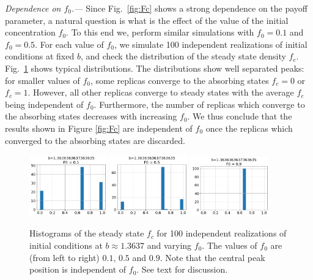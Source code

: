 \documentclass[a4paper]{jpconf}
\begin{document}
\emph{Dependence on $f_0$.---} Since Fig.\ \ref{fig:Fc} shows a strong dependence on the payoff parameter, a natural question is what is the effect of the value of the initial concentration $f_0$. To this end we, perform similar simulations with
$f_0 = 0.1$ and $f_0 = 0.5$. For each value of $f_0$, we simulate 100 independent realizations of initial conditions at fixed $b$, and check the distribution of the steady state density $f_c$. Fig.\ \ref{fig:Fc0_hist} shows typical distributions. The distributions show well separated peaks: for smaller values of $f_0$, some replicas converge to the absorbing states $f_c = 0$ or $f_c = 1$. However, all other replicas converge to steady states with the average $f_c$ being independent of $f_0$. Furthermore, the number of replicas which converge to the absorbing states decreases with increasing $f_0$. We thus conclude that the results shown in Figure \ref{fig:Fc} are independent of $f_0$ once the replicas which converged to the absorbing states are discarded.


\begin{figure}[h]
\includegraphics[width=0.3\textwidth]{b1,3_Fc0,1_hist.png} %
\includegraphics[width=0.3\textwidth]{b1,3_Fc0,5_hist.png} %
\includegraphics[width=0.3\textwidth]{b1,3_Fc0,9_hist.png}
%	
\caption{Histograms of the steady state $f_c$ for 100 independent realizations of initial conditions at $b\approx 1.3637$ and varying $f_0$. The values of $f_0$ are (from left to right) $0.1$, $0.5$ and $0.9$. Note that the central peak position is independent of $f_0$. See text for discussion.}
\label{fig:Fc0_hist}
\end{figure}
\end{document}
